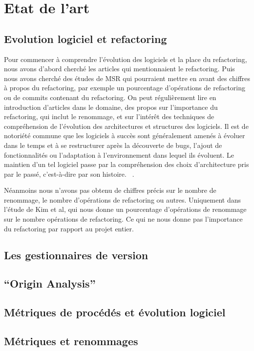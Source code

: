 \section{Etat de l'art}
\label{sec:etat_de_lart}

\subsection{Evolution logiciel et refactoring}
Pour commencer à comprendre l'évolution des logiciels et la place du refactoring, nous avons d'abord cherché les articles qui mentionnaient le refactoring. Puis nous avons cherché des études de MSR qui pourraient mettre en avant des chiffres à propos du refactoring, par exemple un pourcentage d'opérations de refactoring ou de commits contenant du refactoring. On peut régulièrement lire en introduction d'articles dans le domaine, des propos sur l'importance du refactoring, qui inclut le renommage, et sur l'intérêt des techniques de compréhension de l’évolution des architectures et structures des logiciels. Il est de notoriété commune que les logiciels à succès sont généralement amenés à évoluer dans le temps et à se restructurer après la découverte de bugs, l’ajout de fonctionnalités ou l’adaptation à l’environnement dans lequel ils évoluent. Le maintien d’un tel logiciel passe par la compréhension des choix d’architecture pris par le passé, c'est-à-dire par son histoire. ~\cite{tu_integrated_2002,godfrey_tracking_2002,kim_field_2012}.

 Néanmoins nous n'avons pas obtenu de chiffres précis sur le nombre de renommage, le nombre d'opérations de refactoring ou autres. Uniquement dans l'étude de Kim et al, qui nous donne un pourcentage d'opérations de renommage sur le nombre opérations de refactoring. Ce qui ne nous donne pas l'importance du refactoring par rapport au projet entier.\\



\subsection{Les gestionnaires de version}

\subsection{``Origin Analysis''}


\subsection{Métriques de procédés et évolution logiciel}


\subsection{Métriques et renommages}


